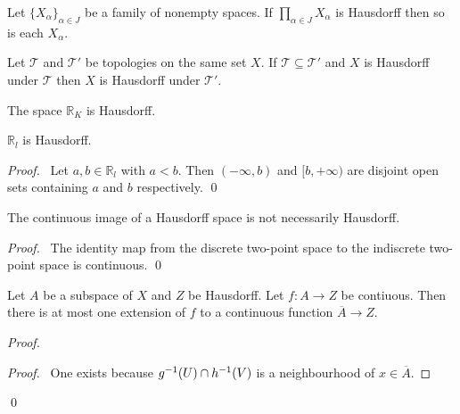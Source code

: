 \begin{cor}
  Let $\{ X_\alpha \}_{\alpha \in J}$ be a family of nonempty spaces. If
  $\prod_{\alpha \in J} X_\alpha$ is Hausdorff then so is each $X_\alpha$.
\end{cor}

\begin{cor}
  Let $\mathcal{T}$ and $\mathcal{T}'$ be topologies on the same set $X$. If
  $\mathcal{T} \subseteq \mathcal{T}'$ and $X$ is Hausdorff under
  $\mathcal{T}$ then $X$ is Hausdorff under $\mathcal{T}'$.
\end{cor}

\begin{cor}
  The space $\mathbb{R}_K$ is Hausdorff.
\end{cor}

 \begin{prop}
 $\mathbb{R}_l$ is Hausdorff.
\end{prop}

\begin{proof}
 \pf\ Let $a, b \in \mathbb{R}_l$ with $a < b$. Then $(- \infty, b)$ and $[b,
+\infty)$ are disjoint open sets containing $a$ and $b$ respectively. \qed
\end{proof}

\begin{prop}
 The continuous image of a Hausdorff space is not necessarily Hausdorff.
\end{prop}

\begin{proof}
 \pf\ The identity map from the discrete two-point space to the indiscrete two-point space is continuous. \qed
\end{proof}

\begin{lm}
 \label{lm:topology:Hausdorff:continuous_extension}
 Let $A$ be a subspace of $X$ and $Z$ be Hausdorff. Let $f : A \rightarrow Z$ be contiuous. Then there is at most one extension of $f$ to a continuous function $\overline{A} \rightarrow Z$.
\end{lm}

\begin{proof}
 \pf
 \begin{proof}
   \pf\ One exists because ${g}^{-1}(U) \cap {h}^{-1}(V)$ is a neighbourhood of $x \in \overline{A}$.
 \end{proof}
 \qed
\end{proof}

